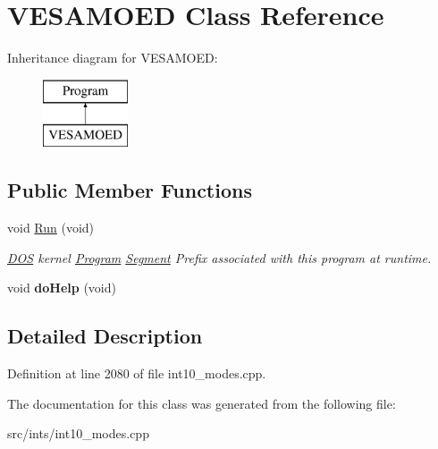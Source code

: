 \hypertarget{classVESAMOED}{\section{V\-E\-S\-A\-M\-O\-E\-D Class Reference}
\label{classVESAMOED}
}
Inheritance diagram for V\-E\-S\-A\-M\-O\-E\-D\-:\begin{figure}[H]
\begin{center}
\leavevmode
\includegraphics[height=2.000000cm]{classVESAMOED}
\end{center}
\end{figure}
\subsection*{Public Member Functions}
\begin{DoxyCompactItemize}
\item 
\hypertarget{classVESAMOED_a28a85c525cde20cbffbfbed307b1747e}{void \hyperlink{classVESAMOED_a28a85c525cde20cbffbfbed307b1747e}{Run} (void)}\label{classVESAMOED_a28a85c525cde20cbffbfbed307b1747e}

\begin{DoxyCompactList}\small\item\em \hyperlink{classDOS}{D\-O\-S} kernel \hyperlink{classProgram}{Program} \hyperlink{structSegment}{Segment} Prefix associated with this program at runtime. \end{DoxyCompactList}\item 
\hypertarget{classVESAMOED_a2c8bf90a08d8a67761958333dcbf298b}{void {\bfseries do\-Help} (void)}\label{classVESAMOED_a2c8bf90a08d8a67761958333dcbf298b}

\end{DoxyCompactItemize}


\subsection{Detailed Description}


Definition at line 2080 of file int10\-\_\-modes.\-cpp.



The documentation for this class was generated from the following file\-:\begin{DoxyCompactItemize}
\item 
src/ints/int10\-\_\-modes.\-cpp\end{DoxyCompactItemize}
